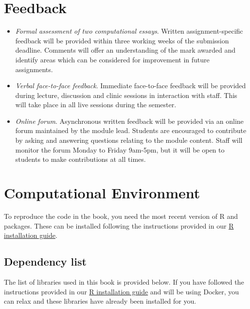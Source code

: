 \documentclass[
  letterpaper,
  krantz2]{style/krantz}
\begin{document}
\hypertarget{feedback}{%
\section{Feedback}\label{feedback}}

\begin{itemize}
\item
  \emph{Formal assessment of two computational essays}. Written
  assignment-specific feedback will be provided within three working
  weeks of the submission deadline. Comments will offer an understanding
  of the mark awarded and identify areas which can be considered for
  improvement in future assignments.
\item
  \emph{Verbal face-to-face feedback}. Immediate face-to-face feedback
  will be provided during lecture, discussion and clinic sessions in
  interaction with staff. This will take place in all live sessions
  during the semester.
\item
  \emph{Online forum}. Asynchronous written feedback will be provided
  via an online forum maintained by the module lead. Students are
  encouraged to contribute by asking and answering questions relating to
  the module content. Staff will monitor the forum Monday to Friday
  9am-5pm, but it will be open to students to make contributions at all
  times.
\end{itemize}

\hypertarget{computational-environment}{%
\section{Computational Environment}\label{computational-environment}}

To reproduce the code in the book, you need the most recent version of R
and packages. These can be installed following the instructions provided
in our \href{https://gdsl-ul.github.io/r_install/}{R installation
guide}.

\hypertarget{dependency-list}{%
\subsection{Dependency list}\label{dependency-list}}

The list of libraries used in this book is provided below. If you have
followed the instructions provided in our
\href{https://gdsl-ul.github.io/r_install/}{R installation guide} and
will be using Docker, you can relax and these libraries have already
been installed for you.
\end{document}
